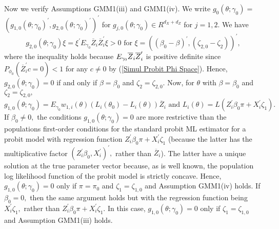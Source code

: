 \documentclass[12pt,titlepage,final,oneside,letterpaper]{article}
\begin{document}
Now we verify Assumptions GMM1(iii) and GMM1(iv). We write $g_{0}(\theta
;\gamma _{0})=$\linebreak $(g_{1,0}(\theta ;\gamma _{0})^{\prime
},g_{2,0}(\theta ;\gamma _{0})^{\prime })^{\prime }$ for $g_{j,0}(\theta
;\gamma _{0})\in R^{d_{X}+d_{Z}}$ for $j=1,2.$ We have 
\begin{equation*}
g_{2,0}(\theta ;\gamma _{0})\xi =\xi ^{\prime }E_{\gamma _{0}}\overline{Z}%
_{i}\overline{Z}_{i}^{\prime }\xi >0\text{ for }\xi =((\beta _{0}-\beta
)^{\prime },(\zeta _{2,0}-\zeta _{2}))^{\prime },
\end{equation*}%
where the inequality holds because $E_{\gamma _{0}}\overline{Z}_{i}\overline{%
Z}_{i}^{\prime }$ is positive definite since $P_{\phi _{0}}(\overline{Z}%
_{i}^{\prime }c=0)<1$ for any $c\neq 0$ by (\ref{Simul Probit Phi Space}).
Hence, $g_{2,0}(\theta ;\gamma _{0})=0$ if and only if $\beta =\beta _{0}$
and $\zeta _{2}=\zeta _{2,0}.$ Now, for $\theta $ with $\beta =\beta _{0}$
and $\zeta _{2}=\zeta _{2,0},$ 
\begin{equation}
g_{1,0}(\theta ;\gamma _{0})=E_{\gamma _{0}}w_{1,i}(\theta )(L_{i}(\theta
_{0})-L_{i}(\theta ))\overline{Z}_{i}\text{ and }L_{i}(\theta
)=L(Z_{i}^{\prime }\beta _{0}\pi +X_{i}^{\prime }\zeta _{1}).
\end{equation}%
If $\beta _{0}\neq 0,$ the conditions $g_{1,0}(\theta ;\gamma _{0})=0$ are
more restrictive than the populations first-order conditions for the
standard probit ML estimator for a probit model with regression function $%
Z_{i}^{\prime }\beta _{0}\pi +X_{i}^{\prime }\zeta _{1}$ (because the latter
has the multiplicative factor $(Z_{i}^{\prime }\beta _{0},X_{i}^{\prime
})^{\prime },$ rather than $\overline{Z}_{i}$). The latter have a unique
solution at the true parameter vector because, as is well known, the
population log likelihood function of the probit model is strictly concave.
Hence, $g_{1,0}(\theta ;\gamma _{0})=0$ only if $\pi =\pi _{0}$ and $\zeta
_{1}=\zeta _{1,0}$ and Assumption GMM1(iv) holds. If $\beta _{0}=0,$ then
the same argument holds but with the regression function being $%
X_{i}^{\prime }\zeta _{1},$ rather than $Z_{i}^{\prime }\beta _{0}\pi
+X_{i}^{\prime }\zeta _{1}.$ In this case, $g_{1,0}(\theta ;\gamma _{0})=0$
only if $\zeta _{1}=\zeta _{1,0}$ and Assumption GMM1(iii) holds.
\end{document}
